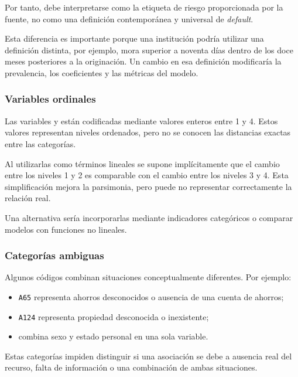 Por tanto,  debe interpretarse como la etiqueta de
riesgo proporcionada por la fuente, no como una definición contemporánea
y universal de \textit{default}.

Esta diferencia es importante porque una institución podría utilizar una
definición distinta, por ejemplo, mora superior a noventa días dentro de
los doce meses posteriores a la originación. Un cambio en esa definición
modificaría la prevalencia, los coeficientes y las métricas del modelo.

\subsubsection{Variables ordinales}

Las variables  y
 están codificadas mediante valores enteros
entre 1 y 4. Estos valores representan niveles ordenados, pero no se
conocen las distancias exactas entre las categorías.

Al utilizarlas como términos lineales se supone implícitamente que el
cambio entre los niveles 1 y 2 es comparable con el cambio entre los
niveles 3 y 4. Esta simplificación mejora la parsimonia, pero puede no
representar correctamente la relación real.

Una alternativa sería incorporarlas mediante indicadores categóricos o
comparar modelos con funciones no lineales.

\subsubsection{Categorías ambiguas}

Algunos códigos combinan situaciones conceptualmente diferentes. Por
ejemplo:

\begin{itemize}
    \item \texttt{A65} representa ahorros desconocidos o ausencia de una
    cuenta de ahorros;

    \item \texttt{A124} representa propiedad desconocida o inexistente;

    \item {} combina sexo y estado
    personal en una sola variable.
\end{itemize}

Estas categorías impiden distinguir si una asociación se debe a ausencia
real del recurso, falta de información o una combinación de ambas
situaciones.

